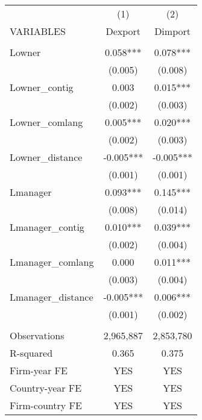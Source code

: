 \begin{tabular}{lcc} \hline
 & (1) & (2) \\
VARIABLES & Dexport & Dimport \\ \hline
 &  &  \\
Lowner & 0.058*** & 0.078*** \\
 & (0.005) & (0.008) \\
Lowner\_contig & 0.003 & 0.015*** \\
 & (0.002) & (0.003) \\
Lowner\_comlang & 0.005*** & 0.020*** \\
 & (0.002) & (0.003) \\
Lowner\_distance & -0.005*** & -0.005*** \\
 & (0.001) & (0.001) \\
Lmanager & 0.093*** & 0.145*** \\
 & (0.008) & (0.014) \\
Lmanager\_contig & 0.010*** & 0.039*** \\
 & (0.002) & (0.004) \\
Lmanager\_comlang & 0.000 & 0.011*** \\
 & (0.003) & (0.004) \\
Lmanager\_distance & -0.005*** & 0.006*** \\
 & (0.001) & (0.002) \\
 &  &  \\
Observations & 2,965,887 & 2,853,780 \\
R-squared & 0.365 & 0.375 \\
Firm-year FE & YES & YES \\
Country-year FE & YES & YES \\
 Firm-country FE & YES & YES \\ \hline
\end{tabular}
